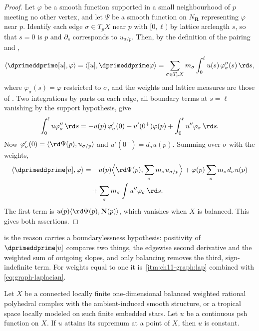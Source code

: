 \begin{proof}
Let $\varphi$ be a smooth function supported in a small neighbourhood of $p$
meeting no other vertex, and let $\Psi$ be a smooth function on
$N_{\mathbf R}$ representing $\varphi$ near $p$.  Identify each edge
$\sigma\in T_pX$ near $p$ with $[0,\ell)$ by lattice arclength $s$, so that
$s=0$ is $p$ and $\partial_s$ corresponds to $u_{\sigma/p}$.  Then, by the
definition of the pairing and ,
\[
 \langle\dprimeddprime[u],\varphi\rangle
 =\langle[u],\dprimeddprime\varphi\rangle
 =\sum_{\sigma\in T_pX}m_\sigma\int_0^\ell u(s)\,\varphi_\sigma''(s)\,\rd s ,
\]
where $\varphi_\sigma(s)=\varphi$ restricted to $\sigma$, and the weights and
lattice measures are those of .  Two
integrations by parts on each edge, all boundary terms at $s=\ell$ vanishing
by the support hypothesis, give
\[
 \int_0^\ell u\varphi_\sigma''\,\rd s
 =-u(p)\,\varphi_\sigma'(0)+u'(0^+)\varphi(p)
   +\int_0^\ell u''\varphi_\sigma\,\rd s .
\]
Now $\varphi_\sigma'(0)=\langle \rd\Psi(p),u_{\sigma/p}\rangle$ and
$u'(0^+)=d_\sigma u(p)$.  Summing over $\sigma$ with the weights,
\[
 \begin{aligned}
 \langle\dprimeddprime[u],\varphi\rangle
 &=-u(p)\Bigl\langle \rd\Psi(p),
      \sum_\sigma m_\sigma u_{\sigma/p}\Bigr\rangle
   +\varphi(p)\sum_\sigma m_\sigma d_\sigma u(p)\\
 &\quad+\sum_\sigma m_\sigma\int u''\varphi_\sigma\,\rd s .
 \end{aligned}
\]
The first term is $u(p)\langle \rd\Psi(p),\mathbf N(p)\rangle$, which
vanishes when $X$ is balanced.  This gives both assertions.
\end{proof}

 is the reason 
carries a boundarylessness hypothesis: positivity of $\dprimeddprime[u]$
compares two things, the edgewise second derivative and the weighted sum of
outgoing slopes, and only balancing removes the third, sign-indefinite term.
For weights equal to one it is \,\cref{itm:ch11-graph:lap}
combined with \eqref{eq:graph-laplacian}.

\begin{theorem}
\label{thm:ch15-max-onedim}
Let $X$ be a connected locally finite one-dimensional balanced weighted
rational polyhedral complex with the ambient-induced smooth structure,
or a tropical space locally modeled on such finite embedded stars.
Let $u$ be a continuous psh function on $X$.  If $u$ attains its
supremum at a point of $X$, then $u$ is constant.
\end{theorem}

